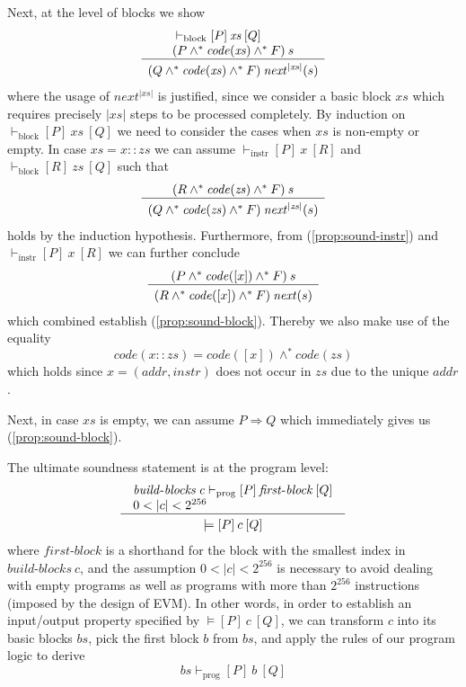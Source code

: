 \documentclass[sigplan,10pt]{acmart}\settopmatter{printfolios=true,printccs=false,printacmref=false}
\newcommand{\subpred}{\Rightarrow}
\newcommand{\sconj}{\wedge^*}
\newcommand{\tvalid}[3]{\models[#1]\:#2\:[#3]}
\newcommand{\ttrip}[5]{\mathit{#1} \vdash_{\mathrm{#2}}[#3]\:#4\:[#5]}
\newcommand{\xnext}{\mathit{next}}
\newcommand{\code}[1]{\mathit{code}(#1)}
\newcommand{\RuleC}[2]{\begin{array}{c}#1\\\hline\noalign{\smallskip}#2\end{array}}
\newcommand{\bblocks}{\mathit{build\mbox{-}blocks}}
\newcommand{\fblock}{\mathit{first\mbox{-}block}}
\newcommand{\len}[1]{|#1|}
\begin{document}
Next, at the level of blocks we show
\begin{equation}
\label{prop:sound-block}
\RuleC{\begin{array}{l}
         \ttrip{}{block}{P}{\mathit{xs}}{Q} \\
         (P \sconj \code{\mathit{xs}} \sconj F)\: s
       \end{array}}
 {(Q \sconj \code{\mathit{xs}} \sconj F)\: \xnext^{\len{\mathit{xs}}}(s)}
\end{equation}
where the usage of $\xnext^{\len{\mathit{xs}}}$ is justified, since we consider
a basic block $\mathit{xs}$ which requires precisely $\len{\mathit{xs}}$ steps
to be processed completely.   
%
By induction on $\ttrip{}{block}{P}{\mathit{xs}}{Q}$ we need to consider the cases
when $\mathit{xs}$ is non-empty or empty.
In case $\mathit{xs} = x::\mathit{zs}$ we can assume $\ttrip{}{instr}{P}{x}{R}$
and $\ttrip{}{block}{R}{\mathit{zs}}{Q}$ such that 
\[
\RuleC{(R \sconj \code{\mathit{zs}} \sconj F)\: s}
 {(Q \sconj \code{\mathit{zs}} \sconj F)\: \xnext^{\len{\mathit{zs}}}(s)}
\]
holds by the induction hypothesis. 
Furthermore, from (\ref{prop:sound-instr}) and $\ttrip{}{instr}{P}{x}{R}$ we can further conclude 
\[
\RuleC{(P \sconj \code{[x]} \sconj F)\: s}
      {(R \sconj \code{[x]} \sconj F)\: \xnext(s)}
\]
which combined establish (\ref{prop:sound-block}).
Thereby we also make use of the equality
\[
\code{x::\mathit{zs}} = \code{[x]} \sconj \code{\mathit{zs}}
\] 
which holds since $x= (\mathit{addr}, \mathit{instr})$ does not occur in $\mathit{zs}$ due to
the unique $\mathit{addr}$.
 
Next, in case $\mathit{xs}$ is empty, we can assume $P \subpred Q$ which
immediately gives us (\ref{prop:sound-block}). 

The ultimate soundness statement is at the program level:
\begin{equation}
\label{prop:sound1}
\RuleC{\begin{array}{l}
       \ttrip{\bblocks\: c}{prog}{P}{\fblock}{Q} \\
       0 < \len{c} < 2^{256} 
       \end{array}}
{\tvalid{P}{c}{Q}}
\end{equation}
where $\fblock$ is a shorthand for the block with the smallest index in $\bblocks\: c$, and
the assumption $0 < \len{c} < 2^{256}$ is necessary to avoid dealing with empty programs
as well as programs with more than $2^{256}$ instructions (imposed by 
the design of EVM). In other words, in order to establish an input/output property specified by 
$\tvalid{P}{c}{Q}$, we can transform $c$ into its basic blocks $\mathit{bs}$, 
pick the first block $b$ from $\mathit{bs}$, and
apply the rules of our program logic to derive 
\[
\ttrip{\mathit{bs}}{prog}{P}{b}{Q}
\]
\end{document}
